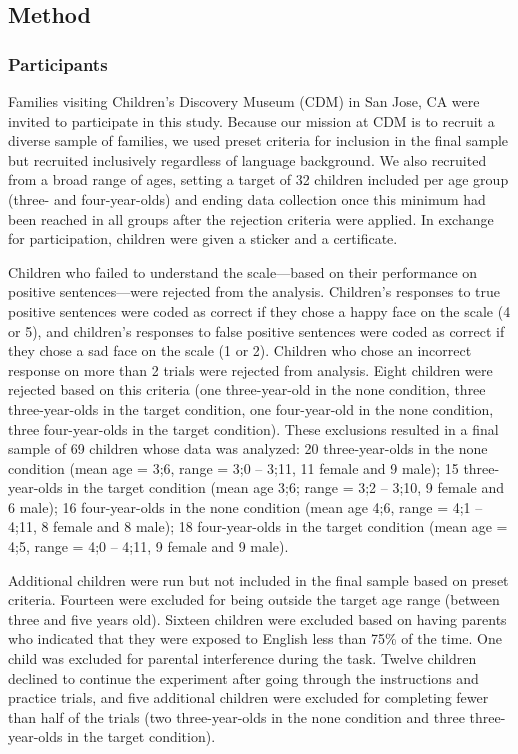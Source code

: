 \documentclass[man, noapacite]{apa2}
\begin{document}
\subsection{Method}

\subsubsection{Participants}

Families visiting Children's Discovery Museum (CDM) in San Jose, CA were invited to participate in this study. Because our mission at CDM is to recruit a diverse sample of families, we used preset criteria for inclusion in the final sample but recruited inclusively regardless of language background. We also recruited from a broad range of ages, setting a target of 32 children included per age group (three- and four-year-olds) and ending data collection once this minimum had been reached in all groups after the rejection criteria were applied. In exchange for participation, children were given a sticker and a certificate.

Children who failed to understand the scale---based on their performance on positive sentences---were rejected from the analysis. Children's responses to true positive sentences were coded as correct if they chose a happy face on the scale (4 or 5), and children's responses to false positive sentences were coded as correct if they chose a sad face on the scale (1 or 2). Children who chose an incorrect response on more than 2 trials were rejected from analysis. Eight children were rejected based on this criteria (one three-year-old in the none condition, three three-year-olds in the target condition, one four-year-old in the none condition, three four-year-olds in the target condition). These exclusions resulted in a final sample of 69 children whose data was analyzed: 20 three-year-olds in the none condition (mean age = 3;6, range = 3;0 -- 3;11, 11 female and 9 male); 15 three-year-olds in the target condition (mean age 3;6; range = 3;2 -- 3;10, 9 female and 6 male); 16 four-year-olds in the none condition (mean age 4;6, range = 4;1 -- 4;11, 8 female and 8 male); 18 four-year-olds in the target condition (mean age = 4;5, range = 4;0 -- 4;11, 9 female and 9 male).

Additional children were run but not included in the final sample based on preset criteria. Fourteen were excluded for being outside the target age range (between three and five years old). Sixteen children were excluded based on having parents who indicated that they were exposed to English less than 75\% of the time. One child was excluded for parental interference during the task. Twelve children declined to continue the experiment after going through the instructions and practice trials, and five additional children were excluded for completing fewer than half of the trials (two three-year-olds in the none condition and three three-year-olds in the target condition).
\end{document}

